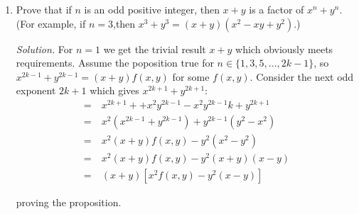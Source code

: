 \documentclass[12pt]{article}
\newcommand\sol[1]{\begin{mdframed}
\emph{Solution.} #1
\end{mdframed}}
\begin{document}
\begin{enumerate}
    \item Prove that if $n$ is an odd positive integer, then $x+y$ is
      a factor of $x^n+y^n$. (For example, if $n=3$,then $x^3+y^3 =
      (x+y)(x^2 - xy + y^2)$.)  \sol{ For $n=1$ we get the trivial
        result $x+y$ which obviously meets requirements. Assume the
        poposition true for $n \in \{1,3,5,...,2k-1\}$, so $x^{2k-1} +
        y^{2k-1} = (x+y)f(x,y)$ for some $f(x,y)$. Consider the next
        odd exponent $2k+1$ which gives $x^{2k+1} + y^{2k+1}$:
        \begin{align*}
          =\ & x^{2k+1} + +x^2y^{2k-1} - x^2y^{2k-1}k + y^{2k+1} \\
          =\ & x^2(x^{2k-1} + y^{2k-1}) + y^{2k-1}(y^2 - x^2) \\
          =\ & x^2(x+y)f(x,y) - y^2(x^2-y^2) \\
          =\ & x^2(x+y)f(x,y) - y^2(x+y)(x-y) \\
          =\ & (x+y)\left [ x^2f(x,y) - y^2(x-y) \right ]
          \end{align*}
      }
      proving the proposition.
    
\end{enumerate}
\end{document}
